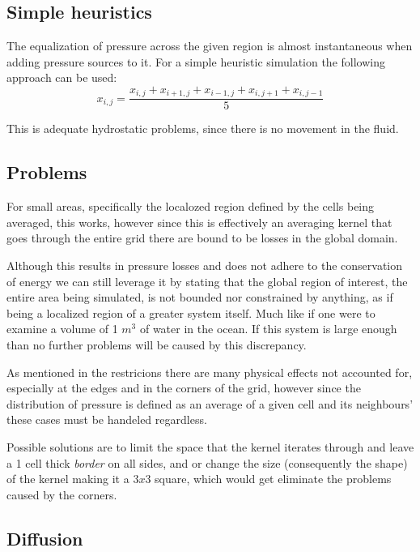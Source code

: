 \documentclass[12pt, titlepage]{article}
\begin{document}
\subsection{Simple heuristics}

The equalization of pressure across the given region is almost instantaneous when adding pressure sources to it. For a simple heuristic simulation the following approach can be used:
\[ 
x_{i, j} = \frac{x_{i, j} + x_{i+1, j} + x_{i-1, j} + x_{i, j+1} + x_{i, j-1}}{5}
\]

This is adequate hydrostatic problems, since there is no movement in the fluid.

\subsection{Problems}
For small areas, specifically the localozed region defined by the cells being averaged, this works, however since this is effectively an averaging kernel that goes through the entire grid there are bound to be losses in the global domain. 

\bigskip

Although this results in pressure losses and does not adhere to the conservation of energy we can still leverage it by stating that the global region of interest, the entire area being simulated, is not bounded nor constrained by anything, as if being a localized region of a greater system itself. Much like if one were to examine a volume of 1 $m^3$ of water in the ocean. If this system is large enough than no further problems will be caused by this discrepancy.

\bigskip

As mentioned in the restricions there are many physical effects not accounted for, especially at the edges and in the corners of the grid, however since the distribution of pressure is defined as an average of a given cell and its neighbours' these cases must be handeled regardless.

Possible solutions are to limit the space that the kernel iterates through and leave a 1 cell thick \textit{border} on all sides, and or change the size (consequently the shape) of the kernel making it a $3x3$ square, which would get eliminate the problems caused by the corners.

\subsection{Diffusion}
\end{document}
